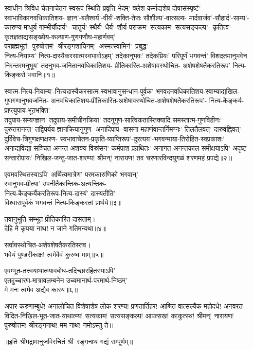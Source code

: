 
\begin{flushleft}
स्वाधीन-त्रिविध-चेतनाचेतन-स्वरूप-स्थिति-प्रवृत्ति-भेदम्'
क्लेश-कर्माद्यशेष-दोषासंस्पृष्टं' स्वाभाविकानवधिकातिशय-
ज्ञान'-बलैश्वर्य'-वीर्य'-शक्ति-तेजः सौशील्य'-वात्सल्य-
मार्दवार्जव'-सौहार्द'-साम्य'-कारुण्य-माधुर्य-गाम्भीर्यौदार्य'-
चातुर्य'-स्थैर्य'-धैर्य'-शौर्य-पराक्रम'-सत्यकाम'-सत्यसङ्कल्प'-
कृतित्व'-कृतज्ञताद्यसङ्ख्येय-कल्याण-गुणगणौघ-महार्णवम्'
\mbox{परब्रह्मभूतं' पुरुषोत्तमं' श्रीरङ्गशायिनम्' अस्मत्स्वामिनं' प्रबुद्ध'}\\
नित्य-नियाम्य' नित्य-दास्यैकरसात्मस्वभावोऽहम्'
तदेकानुभवः' तदेकप्रियः' परिपूर्णं भगवन्तं'
विशदतमानुभवेन निरन्तरमनुभूय' तदनुभव-जनितानवधिकातिशय-%
प्रीतिकारित-अशेषावस्थोचित-
अशेषशेषतैकरतिरूप' नित्य-किङ्करो भवानि॥१॥


स्वात्म-नित्य-नियाम्य'-नित्यदास्यैकरसात्म-स्वभावानुसन्धान-पूर्वक'
भगवदनवधिकातिशय-स्वाम्याद्यखिल-गुणगणानुभवजनित-
अनवधिकातिशय-प्रीतिकारित-अशेषावस्थोचित-अशेषशेषतैकरतिरूप'-%
नित्य-कैङ्कर्य-प्राप्त्युपाय-भूतभक्ति'\\
तदुपाय-सम्यग्ज्ञान' तदुपाय-समीचीनक्रिया'
तदनुगुण-सात्विकतास्तिक्यादि समस्तात्म-गुणविहीनः'
दुरुत्तरानन्त' तद्विपर्यय-ज्ञानक्रियानुगुण-%
अनादिपाप- वासना-महार्णवान्तर्निमग्नः'
तिलतैलवत्' दारुवह्निवत्' दुर्विवेच-त्रिगुणक्षणक्षरण-%
स्वभावाचेतन-प्रकृति-व्याप्तिरूप'-दुरत्यय'-भगवन्माया-तिरोहित-स्वप्रकाशः'
अनाद्यविद्या-सञ्चित-अनन्त-अशक्य-विस्रंसन'-कर्मपाश-प्रग्रथितः'
अनागत-अनन्तकाल-समीक्षयाऽपि' अदृष्ट-सन्तारोपायः'
निखिल-जन्तु-जात-शरण्य! श्रीमन्! नारायण!
तव चरणारविन्दयुगळं शरणमहं प्रपद्ये॥२॥

एवमवस्थितस्याऽपि' अर्थित्वमात्रेण' परमकारुणिको भगवान्'\\
स्वानुभव-प्रीत्या' उपनीतैकान्तिक-अत्यन्तिक-\\
नित्य-कैङ्कर्यैकरतिरूप-नित्य-दास्यं' दास्यतीति' \\
विश्वासपूर्वकं भगवन्तं नित्य-किङ्करतां प्रार्थये॥३॥

तवानुभूति-सम्भूत-प्रीतिकारित-दासताम्।\\
देहि मे कृपया नाथ! न जाने गतिमन्यथा॥४॥

सर्वावस्थोचित-अशेषशेषतैकरतिस्तव।\\
भवेयं पुण्डरीकाक्ष! त्वमेवैवं कुरुष्व माम्॥५॥

एवम्भूत-तत्त्वयाथात्म्यावबोध-तदिच्छारहितस्याऽपि'\\
एतदुच्चारण-मात्रावलम्बनेन उच्यमानार्थ-परमार्थ-निष्ठम्'\\
मे मनः त्वमेव अद्यैव कारय॥६॥

अपार-करुणाम्बुधे! अनालोचित-विशेषाशेष-लोक-शरण्य!
प्रणतार्तिहर! आश्रित-वात्सल्यैक-महोदधे! 
अनवरत-विदित-निखिल-भूत-जात-याथात्म्य!
सत्यकाम! सत्यसङ्कल्प! आपत्सख! काकुत्स्थ! श्रीमन्!
नारायण! पुरुषोत्तम! श्रीरङ्गनाथ! मम नाथ! नमोऽस्तु ते॥
\end{flushleft}
\centerline{॥इति श्रीमद्रामानुजविरचितं श्री~रङ्गनाथ गद्यं सम्पूर्णम्॥}
